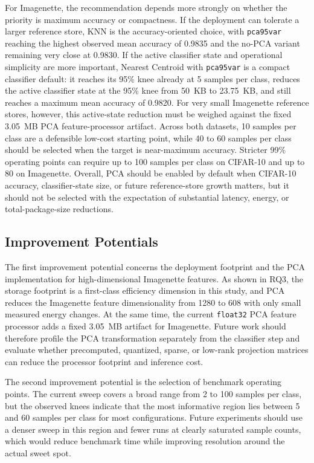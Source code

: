 \documentclass[sigconf,review,nonacm]{acmart}
\begin{document}
For Imagenette, the recommendation depends more strongly on whether the priority is maximum accuracy or compactness.
If the deployment can tolerate a larger reference store, KNN is the accuracy-oriented choice, with \texttt{pca95var} reaching the highest observed mean accuracy of 0.9835 and the no-PCA variant remaining very close at 0.9830.
If the active classifier state and operational simplicity are more important, Nearest Centroid with \texttt{pca95var} is a compact classifier default: it reaches its 95\% knee already at 5 samples per class, reduces the active classifier state at the 95\% knee from 50~KB to 23.75~KB, and still reaches a maximum mean accuracy of 0.9820.
For very small Imagenette reference stores, however, this active-state reduction must be weighed against the fixed 3.05~MB PCA feature-processor artifact.
Across both datasets, 10 samples per class are a defensible low-cost starting point, while 40 to 60 samples per class should be selected when the target is near-maximum accuracy. Stricter 99\% operating points can require up to 100 samples per class on CIFAR-10 and up to 80 on Imagenette.
Overall, PCA should be enabled by default when CIFAR-10 accuracy, classifier-state size, or future reference-store growth matters, but it should not be selected with the expectation of substantial latency, energy, or total-package-size reductions.

\subsection{Improvement Potentials}
The first improvement potential concerns the deployment footprint and the PCA implementation for high-dimensional Imagenette features.
As shown in RQ3, the storage footprint is a first-class efficiency dimension in this study, and PCA reduces the Imagenette feature dimensionality from 1280 to 608 with only small measured energy changes.
At the same time, the current \texttt{float32} PCA feature processor adds a fixed 3.05~MB artifact for Imagenette.
Future work should therefore profile the PCA transformation separately from the classifier step and evaluate whether precomputed, quantized, sparse, or low-rank projection matrices can reduce the processor footprint and inference cost.

The second improvement potential is the selection of benchmark operating points.
The current sweep covers a broad range from 2 to 100 samples per class, but the observed knees indicate that the most informative region lies between 5 and 60 samples per class for most configurations.
Future experiments should use a denser sweep in this region and fewer runs at clearly saturated sample counts, which would reduce benchmark time while improving resolution around the actual sweet spot.
\end{document}
